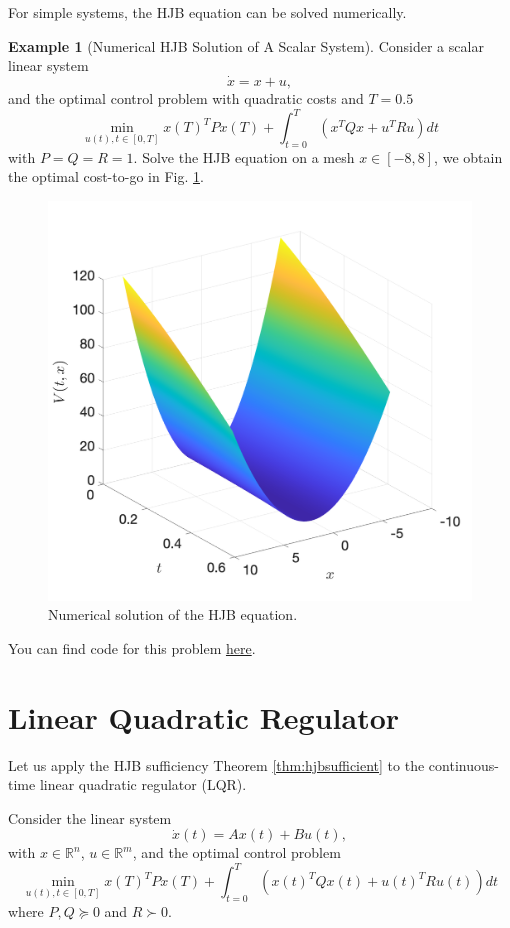 \documentclass[
]{book}
\theoremstyle{definition}
\theoremstyle{definition}
\newtheorem{example}{Example}[chapter]
\theoremstyle{definition}
\theoremstyle{definition}
\theoremstyle{remark}
\begin{document}
For simple systems, the HJB equation can be solved numerically.

\begin{example}[Numerical HJB Solution of A Scalar System]
\protect\hypertarget{exm:solve-scalar-system-numerically}{}\label{exm:solve-scalar-system-numerically}Consider a scalar linear system
\[
\dot{x} = x + u,
\]
and the optimal control problem with quadratic costs and \(T=0.5\)
\[
\min_{u(t),t\in[0,T]} x(T)^T P x(T) + \int_{t=0}^T (x^T Q x + u^T R u ) dt
\]
with \(P=Q=R=1\). Solve the HJB equation on a mesh \(x \in [-8,8]\), we obtain the optimal cost-to-go in Fig. \ref{fig:scalar-system-numerical-V}.

\begin{figure}

{\centering \includegraphics[width=0.6\linewidth]{images/finite_HJB_numerical_solution} 

}

\caption{Numerical solution of the HJB equation.}\label{fig:scalar-system-numerical-V}
\end{figure}

You can find code for this problem \href{https://github.com/ComputationalRobotics/OptimalControlEstimation-Examples/blob/main/finite_HJ.m}{here}.
\end{example}

\hypertarget{linear-quadratic-regulator}{%
\section{Linear Quadratic Regulator}\label{linear-quadratic-regulator}}

Let us apply the HJB sufficiency Theorem \ref{thm:hjbsufficient} to the continuous-time linear quadratic regulator (LQR).

Consider the linear system
\[
\dot{x}(t) = A x(t) + B u(t),
\]
with \(x \in \mathbb{R}^n\), \(u \in \mathbb{R}^m\), and the optimal control problem
\[
\min_{u(t),t\in [0,T]} x(T)^T P x(T) + \int_{t=0}^T (x(t)^T Q x(t) + u(t)^T R u(t)) dt 
\]
where \(P,Q\succeq 0\) and \(R \succ 0\).
\end{document}
